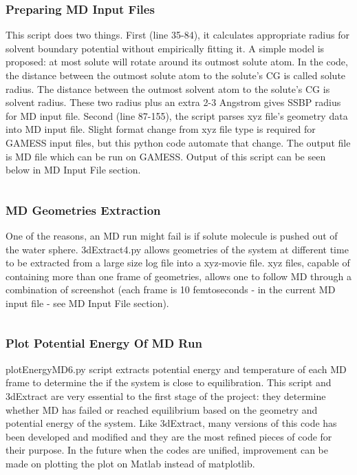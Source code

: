 \documentclass[
journal=jpcbfk, %
manuscript=article]{achemso}
\begin{document}
	\subsubsection{Preparing MD Input Files}
	This script does two things. First (line 35-84), it calculates appropriate radius for solvent boundary potential without empirically fitting it. A simple model is proposed: at most solute will rotate around its outmost solute atom. In the code, the distance between the outmost solute atom to the solute's CG is called solute radius. The distance between the outmost solvent atom to the solute's CG is solvent radius. These two radius plus an extra 2-3 Angstrom gives SSBP radius for MD input file. Second (line 87-155), the script parses xyz file's geometry data into MD input file. Slight format change from xyz file type is required for GAMESS input files, but this python code automate that change. The output file is MD file which can be run on GAMESS. Output of this script can be seen below in MD Input File section.
	\inputminted[linenos, breaklines, baselinestretch=1, fontsize=\small]{python}{../pythonScripts/prepareMD2.py}
	
	\subsubsection{MD Geometries Extraction}
	One of the reasons, an MD run might fail is if solute molecule is pushed out of the water sphere. 3dExtract4.py allows geometries of the system at different time to be extracted from a large size log file into a xyz-movie file. xyz files, capable of containing more than one frame of geometries, allows one to follow MD through a combination of screenshot (each frame is 10 femtoseconds - in the current MD input file - see MD Input File section). 
	\inputminted[linenos, breaklines, baselinestretch=1, fontsize=\small]{python}{../pythonScripts/3dExtract4_full_data.py}
	
	\subsubsection{Plot Potential Energy Of MD Run}
	plotEnergyMD6.py script extracts potential energy and temperature of each MD frame to determine the if the system is close to equilibration. This script and 3dExtract are very essential to the first stage of the project: they determine whether MD has failed or reached equilibrium based on the geometry and potential energy of the system. Like 3dExtract, many versions of this code has been developed and modified and they are the most refined pieces of code for their purpose. In the future when the codes are unified, improvement can be made on plotting the plot on Matlab instead of matplotlib. 
	\inputminted[linenos, breaklines, baselinestretch=1, fontsize=\small]{python}{../pythonScripts/plotEnergyMD6.py} 	
	
\end{document}
